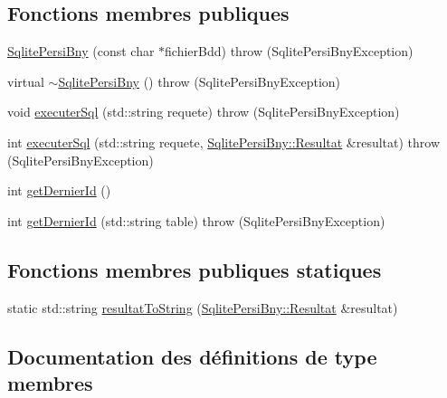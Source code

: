 \subsection*{Fonctions membres publiques}
\begin{DoxyCompactItemize}
\item 
\hyperlink{classSqlitePersiBny_af4ff22e110cfc9ad07460e2aedb9d884}{Sqlite\+Persi\+Bny} (const char $\ast$fichier\+Bdd)  throw (\+Sqlite\+Persi\+Bny\+Exception)
\item 
virtual \hyperlink{classSqlitePersiBny_a20a424146469e8d6ca9347c660d1027c}{$\sim$\+Sqlite\+Persi\+Bny} ()  throw (\+Sqlite\+Persi\+Bny\+Exception)
\item 
void \hyperlink{classSqlitePersiBny_aa018371d06ba831126a6c4fdc77b741f}{executer\+Sql} (std\+::string requete)  throw (\+Sqlite\+Persi\+Bny\+Exception)
\item 
int \hyperlink{classSqlitePersiBny_aaca09292fb3eb5e7bbf176c86964ff73}{executer\+Sql} (std\+::string requete, \hyperlink{classSqlitePersiBny_a04bdd1bacd9241210ea44ec2c072f79b}{Sqlite\+Persi\+Bny\+::\+Resultat} \&resultat)  throw (\+Sqlite\+Persi\+Bny\+Exception)
\item 
int \hyperlink{classSqlitePersiBny_a44284ce3b32df4a0f2c0f053323cc4b9}{get\+Dernier\+Id} ()
\item 
int \hyperlink{classSqlitePersiBny_a3f6a2b7a50d826cc030ac60aadf54d8f}{get\+Dernier\+Id} (std\+::string table)  throw (\+Sqlite\+Persi\+Bny\+Exception)
\end{DoxyCompactItemize}
\subsection*{Fonctions membres publiques statiques}
\begin{DoxyCompactItemize}
\item 
static std\+::string \hyperlink{classSqlitePersiBny_a6c80449c682a18e9e9ce0a860f05088d}{resultat\+To\+String} (\hyperlink{classSqlitePersiBny_a04bdd1bacd9241210ea44ec2c072f79b}{Sqlite\+Persi\+Bny\+::\+Resultat} \&resultat)
\end{DoxyCompactItemize}


\subsection{Documentation des définitions de type membres}
\mbox{\label{classSqlitePersiBny_af3de7ea7bd4146b4ce0a00ceae01befd}} 
